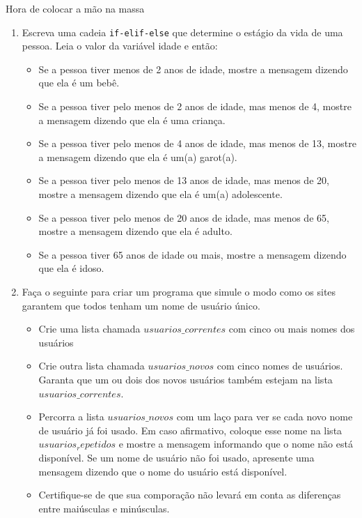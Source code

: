 \begin{frame}{Hora de colocar a mão na massa}
  \begin{enumerate}
    \item Escreva uma cadeia \verb!if-elif-else! que determine o estágio da vida de uma pessoa. Leia o valor da variável idade e então:
    \begin{itemize}
      \item Se a pessoa tiver menos de 2 anos de idade, mostre a mensagem dizendo que ela é um bebê.
      \item Se a pessoa tiver pelo menos de 2 anos de idade, mas menos de 4, mostre a mensagem dizendo que ela é uma criança.
      \item Se a pessoa tiver pelo menos de 4 anos de idade, mas menos de 13, mostre a mensagem dizendo que ela é um(a) garot(a).
      \item Se a pessoa tiver pelo menos de 13 anos de idade, mas menos de 20, mostre a mensagem dizendo que ela é um(a) adolescente.
      \item Se a pessoa tiver pelo menos de 20 anos de idade, mas menos de 65, mostre a mensagem dizendo que ela é adulto.
      \item Se a pessoa tiver 65 anos de idade ou mais, mostre a mensagem dizendo que ela é idoso.
    \end{itemize}
    \item Faça o seguinte para criar um programa que simule o modo como os sites garantem que todos tenham um nome de usuário único.
    \begin{itemize}
      \item Crie uma lista chamada {\bf $usuarios\_correntes$} com cinco ou mais nomes dos usuários
      \item Crie outra lista chamada {\bf $usuarios\_novos$} com cinco nomes de usuários. Garanta que um ou dois dos novos usuários também estejam na lista {\bf $usuarios\_correntes$}.
      \item Percorra a lista {\bf $usuarios\_novos$} com um laço para ver se cada novo nome de usuário já foi usado. Em caso afirmativo, coloque esse nome na lista $usuarios_repetidos$ e mostre a mensagem informando que o nome não está disponível. Se um nome de usuário não foi usado, apresente uma mensagem dizendo que o nome do usuário está disponível.
      \item Certifique-se de que sua comporação não levará em conta as diferenças entre maiúsculas e minúsculas.
    \end{itemize}
  \end{enumerate}
\end{frame}